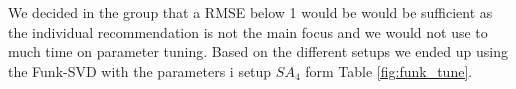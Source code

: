 We decided in the group that a RMSE below 1 would be would be sufficient as the individual recommendation is not the main focus and we would not use to much time on parameter tuning. Based on the different setups we ended up using the Funk-SVD with the parameters i setup $SA_4$ form Table \ref{fig:funk_tune}.